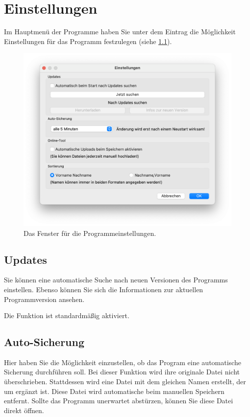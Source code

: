 \chapter{Einstellungen}\label{epl:allg:einstellungen}
Im Hauptmenü der Programme haben Sie unter dem Eintrag 
die Möglichkeit Einstellungen für das Programm festzulegen
(siehe \cref{fig:einstellungen}).
\begin{figure}[!h]
  \centering
	\includegraphics[width=.75\textwidth]{img/einstellungen}
	\caption{Das Fenster für die Programmeinstellungen.}
	\label{fig:einstellungen}
\end{figure}



\section{Updates}
Sie können eine automatische Suche nach neuen Versionen des Programms einstellen.
Ebenso können Sie sich die Informationen zur aktuellen Programmversion ansehen.

Die Funktion ist standardmäßig aktiviert.



\section{Auto-Sicherung}
Hier haben Sie die Möglichkeit einzustellen, ob das Program eine automatische Sicherung durchführen soll.
Bei dieser Funktion wird ihre originale Datei nicht überschrieben.
Stattdessen wird eine Datei mit dem gleichen Namen erstellt, der um  ergänzt ist.
Diese Datei wird automatische beim manuellen Speichern entfernt.
Sollte das Programm unerwartet abstürzen, können Sie diese Datei direkt öffnen.

